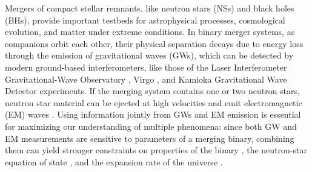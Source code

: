 \documentclass[fleqn,usenatbib,useAMS]{mnras}
\begin{document}
Mergers of compact stellar remnants, like neutron stars (NSs) and black holes (BHs), provide important testbeds for astrophysical processes, cosmological evolution, and matter under extreme conditions.
In binary merger systems, as companions orbit each other, their physical separation decays due to energy loss through the emission of gravitational waves (GWs), which can be detected by modern ground-based interferometers, like those of the Laser Interferometer Gravitational-Wave Observatory \citep[LIGO;][]{AdvancedLIGO}, Virgo \citep{AdvancedVirgo}, and Kamioka Gravitational Wave Detector \citep[KAGRA;][]{KAGRA} experiments.
If the merging system contains one or two neutron stars, neutron star material can be ejected at high velocities and emit electromagnetic (EM) waves \citep{lattimerBlackholeneutronstarCollisions1974,liTransientEventsNeutron1998,MetzgerBergerPromising, 10.3389/fspas.2020.609460}.
Using information jointly from GWs and EM emission is essential for maximizing our understanding of multiple phenomena: since both GW and EM measurements are sensitive to parameters of a merging binary, combining them can yield stronger constraints on properties of the binary \citep{CoughlinTowardRapidKN}, the neutron-star equation of state \citep{Radice:2017lry,coughlinConstraintsNeutronStar2018}, and the expansion rate of the universe \citep{Schutz1986,Holz:2005df,abbottGravitationalwaveStandardSiren2017}. 
\end{document}
